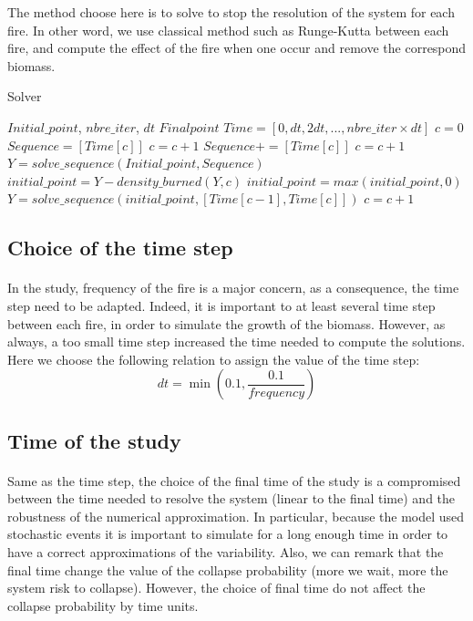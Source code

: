 \documentclass{article}
\begin{document}
The method choose here is to solve to stop the resolution of the system for each fire. In other word, we use classical method such as Runge-Kutta between each fire, and compute the effect of the fire when one occur and remove the correspond biomass.



\begin{algorithm}
\caption{Solver}
\begin{algorithmic}
\REQUIRE $Initial\_point$, $nbre\_iter$, $dt$
\ENSURE $Final point$
\STATE $Time = [0, dt, 2dt, ..., nbre\_iter \times dt]$
\STATE $c=0$
        \STATE $Sequence = [Time[c]]$
        \STATE  $c = c + 1$
            \STATE $Sequence += [Time[c]]$
            \STATE $c = c + 1$
        \ENDWHILE
        \STATE $Y = solve\_sequence(Initial\_point, Sequence)$
    \ELSE
        \STATE $initial\_point = Y - density\_burned(Y, c)$
        \STATE $initial\_point = max(initial\_point, 0)$
        \STATE $Y = solve\_sequence(initial\_point, [Time[c-1], Time[c]])$
        \STATE $c = c + 1$
    \ENDIF
\ENDWHILE
\end{algorithmic}
\end{algorithm}

\newpage

\subsection{Choice of the time step}

\paragraph{}
In the study, frequency of the fire is a major concern, as a consequence, the time step need to be adapted. Indeed, it is important to at least several time step between each fire, in order to simulate the growth of the biomass. However, as always, a too small time step increased the time needed to compute the solutions. Here we choose the following relation to assign the value of the time step:
\[
dt = \min(0.1, \frac{0.1}{frequency})
\]



\subsection{Time of the study}

\paragraph{}
Same as the time step, the choice of the final time of the study is a compromised between the time needed to resolve the system (linear to the final time) and the robustness of the numerical approximation. In particular, because the model used stochastic events it is important to simulate for a long enough time in order to have a correct approximations of the variability.
Also, we can remark that the final time change the value of the collapse probability (more we wait, more the system risk to collapse). However, the choice of final time do not affect the collapse probability by time units.
\end{document}
